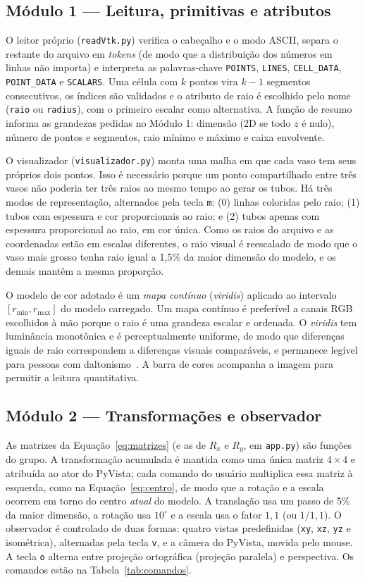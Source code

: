 \documentclass[11pt, a4paper]{article}
\begin{document}
\subsection{Módulo 1 --- Leitura, primitivas e atributos}
O leitor próprio (\texttt{readVtk.py}) verifica o cabeçalho e o modo ASCII, separa o restante do arquivo em \emph{tokens} (de modo que a distribuição dos números em linhas não importa) e interpreta as palavras-chave \texttt{POINTS}, \texttt{LINES}, \texttt{CELL\_DATA}, \texttt{POINT\_DATA} e \texttt{SCALARS}. Uma célula com $k$ pontos vira $k-1$ segmentos consecutivos, os índices são validados e o atributo de raio é escolhido pelo nome (\texttt{raio} ou \texttt{radius}), com o primeiro escalar como alternativa. A função de resumo informa as grandezas pedidas no Módulo 1: dimensão (2D se todo $z$ é nulo), número de pontos e segmentos, raio mínimo e máximo e caixa envolvente.

O visualizador (\texttt{visualizador.py}) monta uma malha em que cada vaso tem seus próprios dois pontos. Isso é necessário porque um ponto compartilhado entre três vasos não poderia ter três raios ao mesmo tempo ao gerar os tubos. Há três modos de representação, alternados pela tecla \texttt{m}: (0) linhas coloridas pelo raio; (1) tubos com espessura e cor proporcionais ao raio; e (2) tubos apenas com espessura proporcional ao raio, em cor única. Como os raios do arquivo e as coordenadas estão em escalas diferentes, o raio visual é reescalado de modo que o vaso mais grosso tenha raio igual a 1,5\% da maior dimensão do modelo, e os demais mantêm a mesma proporção.

O modelo de cor adotado é um \emph{mapa contínuo} (\emph{viridis}) aplicado ao intervalo $[r_{\min},r_{\max}]$ do modelo carregado. Um mapa contínuo é preferível a canais RGB escolhidos à mão porque o raio é uma grandeza escalar e ordenada. O \emph{viridis} tem luminância monotônica e é perceptualmente uniforme, de modo que diferenças iguais de raio correspondem a diferenças visuais comparáveis, e permanece legível para pessoas com daltonismo~\cite{smith2015}. A barra de cores acompanha a imagem para permitir a leitura quantitativa.

\subsection{Módulo 2 --- Transformações e observador}
As matrizes da Equação~\ref{eq:matrizes} (e as de $R_x$ e $R_y$, em \texttt{app.py}) são funções do grupo. A transformação acumulada é mantida como uma única matriz $4\times4$ e atribuída ao ator do PyVista; cada comando do usuário multiplica essa matriz à esquerda, como na Equação~\ref{eq:centro}, de modo que a rotação e a escala ocorrem em torno do centro \emph{atual} do modelo. A translação usa um passo de 5\% da maior dimensão, a rotação usa $10^{\circ}$ e a escala usa o fator $1{,}1$ (ou $1/1{,}1$). O observador é controlado de duas formas: quatro vistas predefinidas (\texttt{xy}, \texttt{xz}, \texttt{yz} e isométrica), alternadas pela tecla \texttt{v}, e a câmera do PyVista, movida pelo mouse. A tecla \texttt{o} alterna entre projeção ortográfica (projeção paralela) e perspectiva. Os comandos estão na Tabela~\ref{tab:comandos}.
\end{document}
